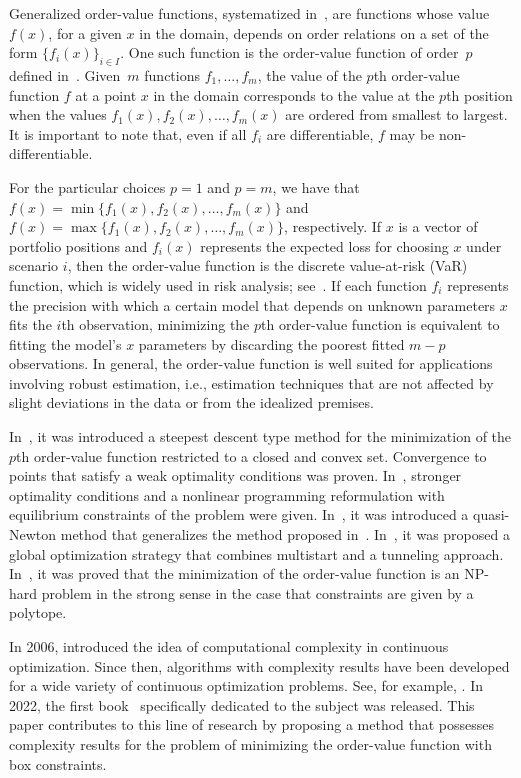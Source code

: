 \documentclass[11pt]{article}
\begin{document}
Generalized order-value functions, systematized in~\cite{mtop}, are functions whose value~$f(x)$, for a given $x$ in the domain, depends on order relations on a set of the form $\{f_i(x)\}_{i \in I}$. One such function is the order-value function of order~$p$ defined in~\cite{dunder1,dunder2}. Given~$m$ functions $f_1,\dots,f_m$, the value of the $p$th order-value function $f$ at a point $x$ in the domain corresponds to the value at the $p$th position when the values $f_1(x), f_2(x), \dots, f_m(x)$ are ordered from smallest to largest. It is important to note that, even if all $f_i$ are differentiable, $f$ may be non-differentiable.

For the particular choices $p=1$ and $p=m$, we have that $f(x)=\min\{ f_1(x), f_2(x), \dots, f_m(x)\}$ and $f(x)=\max\{ f_1(x), f_2(x), \dots, f_m(x)\}$, respectively. If $x$ is a vector of portfolio positions and $f_i(x)$ represents the expected loss for choosing $x$ under scenario $i$, then the order-value function is the discrete value-at-risk (VaR) function, which is widely used in risk analysis; see~\cite{jorion}. If each function $f_i$ represents the precision with which a certain model that depends on unknown parameters $x$ fits the $i$th observation, minimizing the $p$th order-value function is equivalent to fitting the model's $x$ parameters by discarding the poorest fitted $m-p$ observations. In general, the order-value function is well suited for applications involving robust estimation, i.e., estimation techniques that are not affected by slight deviations in the data or from the idealized premises.

In~\cite{dunder1}, it was introduced a steepest descent type method for the minimization of the $p$th order-value function restricted to a closed and convex set. Convergence to points that satisfy a weak optimality conditions was proven. In~\cite{dunder2}, stronger optimality conditions and a nonlinear programming reformulation with equilibrium constraints of the problem were given. In~\cite{yano1}, it was introduced a quasi-Newton method that generalizes the method proposed in~\cite{dunder1}. In~\cite{salva}, it was proposed a global optimization strategy that combines multistart and a tunneling approach. In~\cite{jiang}, it was proved that the minimization of the order-value function is an NP-hard problem in the strong sense in the case that constraints are given by a polytope.

In 2006, \cite{nesterov} introduced the idea of computational complexity in continuous optimization. Since then, algorithms with complexity results have been developed for a wide variety of continuous optimization problems. See, for example, \cite{bgmst2,bgmst1}. In 2022, the first book~\cite{cogtbook} specifically dedicated to the subject was released. This paper contributes to this line of research by proposing a method that possesses complexity results for the problem of minimizing the order-value function with box constraints.
\end{document}

